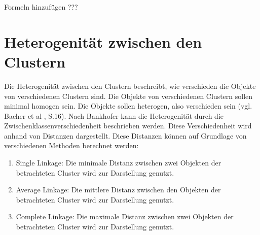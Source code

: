 Formeln hinzufügen ???
\section{Heterogenität zwischen den Clustern}
Die Heterogenität zwischen den Clustern beschreibt, wie verschieden die Objekte von verschiedenen Clustern sind. Die Objekte von verschiedenen Clustern sollen minimal homogen sein. Die Objekte sollen heterogen, also verschieden sein (vgl. Bacher et al \cite{Bacher.2010}, S.16).
Nach Bankhofer \cite{Bankhofer.2008} kann die Heterogenität durch die Zwischenklassenverschiedenheit beschrieben werden. Diese Verschiedenheit wird anhand von Distanzen dargestellt. Diese Distanzen können auf Grundlage von verschiedenen Methoden berechnet werden:
\begin{enumerate}
        \item Single Linkage: Die minimale Distanz zwischen zwei Objekten der betrachteten Cluster wird zur Darstellung genutzt.
        \item Average Linkage: Die mittlere Distanz zwischen den Objekten der betrachteten Cluster wird zur Darstellung genutzt.
        \item Complete Linkage: Die maximale Distanz zwischen zwei Objekten der betrachteten Cluster wird zur Darstellung genutzt.
\end{enumerate}
